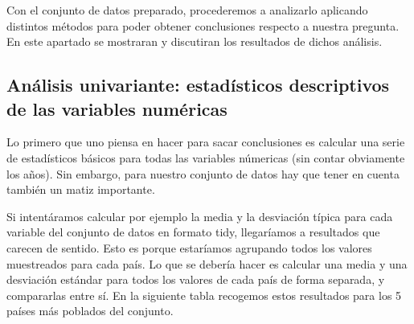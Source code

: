 \documentclass[water,article,submit,pdftex,moreauthors]{Definitions/mdpi}
\begin{document}
Con el conjunto de datos preparado, procederemos a analizarlo aplicando
distintos métodos para poder obtener conclusiones respecto a nuestra
pregunta. En este apartado se mostraran y discutiran los resultados de
dichos análisis.

\subsection{Análisis univariante: estadísticos descriptivos de las
variables
numéricas}\label{anuxe1lisis-univariante-estaduxedsticos-descriptivos-de-las-variables-numuxe9ricas}

Lo primero que uno piensa en hacer para sacar conclusiones es calcular
una serie de estadísticos básicos para todas las variables númericas
(sin contar obviamente los años). Sin embargo, para nuestro conjunto de
datos hay que tener en cuenta también un matiz importante.

Si intentáramos calcular por ejemplo la media y la desviación típica
para cada variable del conjunto de datos en formato tidy, llegaríamos a
resultados que carecen de sentido. Esto es porque estaríamos agrupando
todos los valores muestreados para cada país. Lo que se debería hacer es
calcular una media y una desviación estándar para todos los valores de
cada país de forma separada, y compararlas entre sí. En la siguiente
tabla recogemos estos resultados para los 5 países más poblados del
conjunto.
\end{document}

